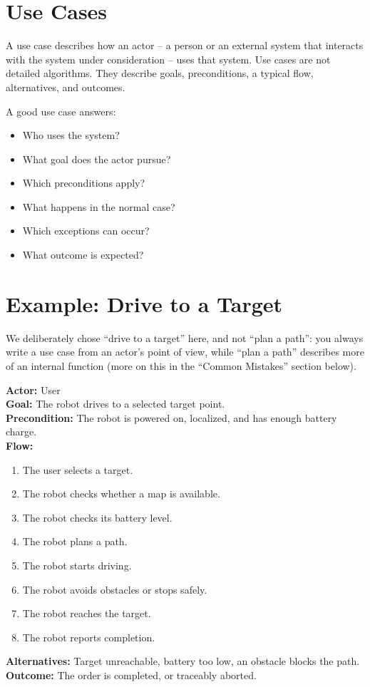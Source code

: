 \section{Use Cases}
A use case describes how an actor -- a person or an external system that interacts with the system under consideration -- uses that system. Use cases are not detailed algorithms. They describe goals, preconditions, a typical flow, alternatives, and outcomes.

A good use case answers:

\begin{itemize}
    \item Who uses the system?
    \item What goal does the actor pursue?
    \item Which preconditions apply?
    \item What happens in the normal case?
    \item Which exceptions can occur?
    \item What outcome is expected?
\end{itemize}

\section{Example: Drive to a Target}
We deliberately chose \enquote{drive to a target} here, and not \enquote{plan a path}: you always write a use case from an actor's point of view, while \enquote{plan a path} describes more of an internal function (more on this in the \enquote{Common Mistakes} section below).

\textbf{Actor:} User\\
\textbf{Goal:} The robot drives to a selected target point.\\
\textbf{Precondition:} The robot is powered on, localized, and has enough battery charge.\\
\textbf{Flow:}
\begin{enumerate}
    \item The user selects a target.
    \item The robot checks whether a map is available.
    \item The robot checks its battery level.
    \item The robot plans a path.
    \item The robot starts driving.
    \item The robot avoids obstacles or stops safely.
    \item The robot reaches the target.
    \item The robot reports completion.
\end{enumerate}
\textbf{Alternatives:} Target unreachable, battery too low, an obstacle blocks the path.\\
\textbf{Outcome:} The order is completed, or traceably aborted.

